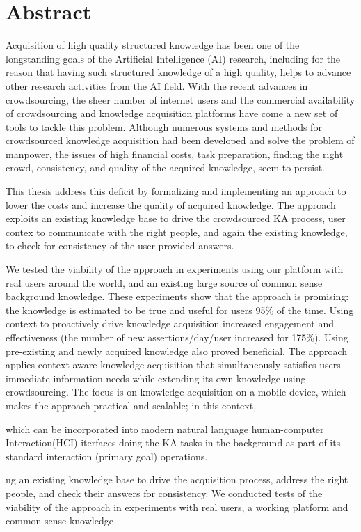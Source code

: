 % 
\chapter*{Abstract}
Acquisition of high quality structured knowledge has been one of the 
longstanding goals of the Artificial Intelligence (AI) research, including for 
the reason that having such structured knowledge of a high quality, helps to 
advance other research activities from the AI field. With the recent advances 
in crowdsourcing, the sheer number of internet users and the commercial 
availability of crowdsourcing and knowledge acquisition platforms have come a 
new set of tools to tackle this problem. Although numerous systems and methods 
for crowdsourced knowledge acquisition had been developed and solve the problem
of manpower, the issues of high financial costs, task preparation, finding 
the right crowd, consistency, and quality of the acquired knowledge, seem to 
persist. 

This thesis address this deficit by formalizing and implementing an approach
to lower the costs and increase the quality of acquired knowledge. The approach
exploits an existing knowledge base to drive the crowdsourced KA process, 
user contex to communicate with the right people, and again the existing
knowledge, to check for consistency of the user-provided answers. 

We tested the 
viability of the approach in experiments using our platform with real users around the world, and an existing large source of common sense background knowledge. These experiments show that the approach is promising: the knowledge is estimated to be true and useful for users 95\% of the time. Using context to proactively drive knowledge acquisition increased engagement and effectiveness (the number of new assertions/day/user increased for 175\%). Using pre-existing and newly acquired knowledge also proved beneficial.
The
approach applies context aware knowledge acquisition that simultaneously satisfies users immediate information needs while extending its own knowledge using crowdsourcing. The focus is on knowledge acquisition on a mobile device, which makes the approach practical and scalable; in this context, 


which can be incorporated into modern natural language
human-computer Interaction(HCI) iterfaces doing the KA tasks in the background
as part of its standard interaction (primary goal) operations. 



ng an existing knowledge base to drive the acquisition process, address the right people, and check their answers for consistency. We conducted tests of the viability of the approach in experiments with real users, a working platform and common sense knowledge
